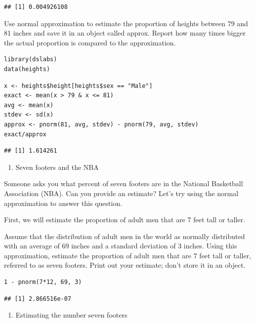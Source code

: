 \documentclass[
]{article}
\providecommand{\tightlist}{%
  \setlength{\itemsep}{0pt}\setlength{\parskip}{0pt}}
\begin{document}
\begin{verbatim}
## [1] 0.004926108
\end{verbatim}

Use normal approximation to estimate the proportion of heights between
79 and 81 inches and save it in an object called approx. Report how many
times bigger the actual proportion is compared to the approximation.

\begin{verbatim}
library(dslabs)
data(heights)
\end{verbatim}

\begin{verbatim}
x <- heights$height[heights$sex == "Male"]
exact <- mean(x > 79 & x <= 81)
avg <- mean(x)
stdev <- sd(x)
approx <- pnorm(81, avg, stdev) - pnorm(79, avg, stdev)
exact/approx
\end{verbatim}

\begin{verbatim}
## [1] 1.614261
\end{verbatim}

\begin{enumerate}
\def\labelenumi{\arabic{enumi}.}
\setcounter{enumi}{3}
\tightlist
\item
  Seven footers and the NBA
\end{enumerate}

Someone asks you what percent of seven footers are in the National
Basketball Association (NBA). Can you provide an estimate? Let's try
using the normal approximation to answer this question.

First, we will estimate the proportion of adult men that are 7 feet tall
or taller.

Assume that the distribution of adult men in the world as normally
distributed with an average of 69 inches and a standard deviation of 3
inches. Using this approximation, estimate the proportion of adult men
that are 7 feet tall or taller, referred to as seven footers. Print out
your estimate; don't store it in an object.

\begin{verbatim}
1 - pnorm(7*12, 69, 3)
\end{verbatim}

\begin{verbatim}
## [1] 2.866516e-07
\end{verbatim}

\begin{enumerate}
\def\labelenumi{\arabic{enumi}.}
\setcounter{enumi}{4}
\tightlist
\item
  Estimating the number seven footers
\end{enumerate}
\end{document}
